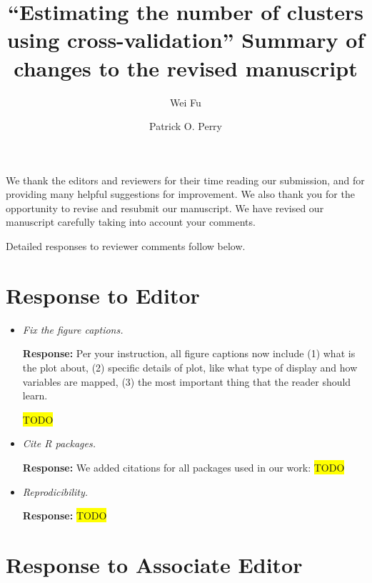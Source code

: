 \documentclass[11pt]{article}
\title{``Estimating the number of clusters using cross-validation''
Summary of changes to the revised manuscript}
\author{Wei Fu \and Patrick O. Perry}
\newcommand{\hilight}[1]{\colorbox{yellow}{#1}}
\newcommand{\todo}{\hilight{TODO}}
\begin{document}
\maketitle
\setlength{\parindent}{0ex}
\setlength{\parskip}{1ex}
\vspace{2ex}

We thank the editors and reviewers for their time reading our submission, and
for providing many helpful suggestions for improvement.  We also thank you for
the opportunity to revise and resubmit our manuscript.  We have revised our
manuscript carefully taking into account your comments.

Detailed responses to reviewer comments follow below.


\section*{Response to Editor}

\begin{itemize}

\item \textit{Fix the figure captions.}

\textbf{Response:} Per your instruction, all figure captions now include
(1) what is the plot about, (2) specific details of plot, like what type of
display and how variables are mapped, (3) the most important thing that the
reader should learn.

\todo


\item \textit{Cite R packages.}

\textbf{Response:} We added citations for all packages used in our work: \todo


\item \textit{Reprodicibility.}

\textbf{Response:} \todo



\end{itemize}


\section*{Response to Associate Editor}
\end{document}
